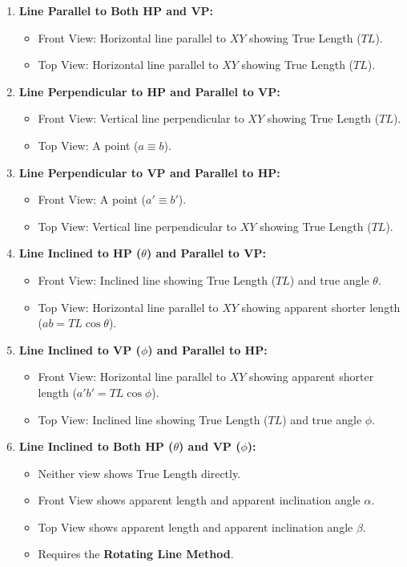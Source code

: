 \begin{enumerate}
    \item \textbf{Line Parallel to Both HP and VP:}
    \begin{itemize}
        \item Front View: Horizontal line parallel to $XY$ showing True Length ($TL$).
        \item Top View: Horizontal line parallel to $XY$ showing True Length ($TL$).
    \end{itemize}
    \item \textbf{Line Perpendicular to HP and Parallel to VP:}
    \begin{itemize}
        \item Front View: Vertical line perpendicular to $XY$ showing True Length ($TL$).
        \item Top View: A point ($a \equiv b$).
    \end{itemize}
    \item \textbf{Line Perpendicular to VP and Parallel to HP:}
    \begin{itemize}
        \item Front View: A point ($a' \equiv b'$).
        \item Top View: Vertical line perpendicular to $XY$ showing True Length ($TL$).
    \end{itemize}
    \item \textbf{Line Inclined to HP ($\theta$) and Parallel to VP:}
    \begin{itemize}
        \item Front View: Inclined line showing True Length ($TL$) and true angle $\theta$.
        \item Top View: Horizontal line parallel to $XY$ showing apparent shorter length ($ab = TL \cos \theta$).
    \end{itemize}
    \item \textbf{Line Inclined to VP ($\phi$) and Parallel to HP:}
    \begin{itemize}
        \item Front View: Horizontal line parallel to $XY$ showing apparent shorter length ($a'b' = TL \cos \phi$).
        \item Top View: Inclined line showing True Length ($TL$) and true angle $\phi$.
    \end{itemize}
    \item \textbf{Line Inclined to Both HP ($\theta$) and VP ($\phi$):}
    \begin{itemize}
        \item Neither view shows True Length directly.
        \item Front View shows apparent length and apparent inclination angle $\alpha$.
        \item Top View shows apparent length and apparent inclination angle $\beta$.
        \item Requires the \textbf{Rotating Line Method}.
    \end{itemize}
\end{enumerate}

